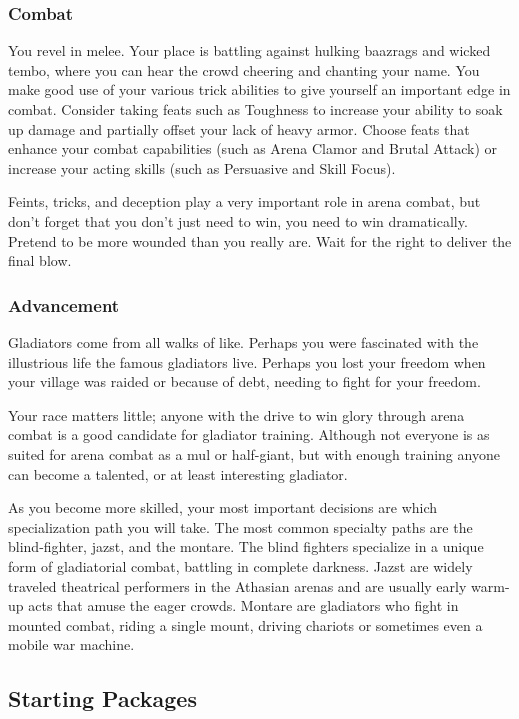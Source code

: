 \subsubsection{Combat}
You revel in melee. Your place is battling against hulking baazrags and wicked tembo, where you can hear the crowd cheering and chanting your name. You make good use of your various trick abilities to give yourself an important edge in combat. Consider taking feats such as Toughness to increase your ability to soak up damage and partially offset your lack of heavy armor. Choose feats that enhance your combat capabilities (such as Arena Clamor and Brutal Attack) or increase your acting skills (such as Persuasive and Skill Focus).

Feints, tricks, and deception play a very important role in arena combat, but don't forget that you don't just need to win, you need to win dramatically. Pretend to be more wounded than you really are. Wait for the right to deliver the final blow.

\subsubsection{Advancement}
Gladiators come from all walks of like. Perhaps you were fascinated with the illustrious life the famous gladiators live. Perhaps you lost your freedom when your village was raided or because of debt, needing to fight for your freedom.

Your race matters little; anyone with the drive to win glory through arena combat is a good candidate for gladiator training. Although not everyone is as suited for arena combat as a mul or half-giant, but with enough training anyone can become a talented, or at least interesting gladiator.

As you become more skilled, your most important decisions are which specialization path you will take. The most common specialty paths are the blind-fighter, jazst, and the montare. The blind fighters specialize in a unique form of gladiatorial combat, battling in complete darkness. Jazst are widely traveled theatrical performers in the Athasian arenas and are usually early warm-up acts that amuse the eager crowds. Montare are gladiators who fight in mounted combat, riding a single mount, driving chariots or sometimes even a mobile war machine.

\subsection{Starting Packages}
